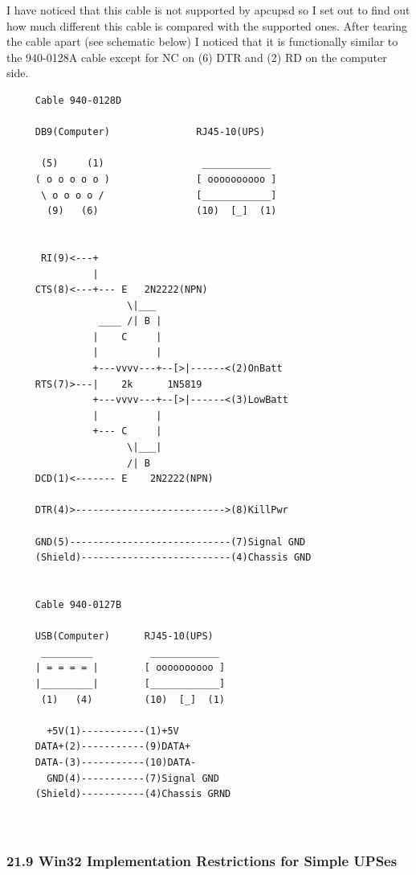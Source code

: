 {{{{{{{{{{I have noticed that this cable is not supported by apcupsd so I set out to
find out how much different this cable is compared with the supported ones.
After tearing the cable apart (see schematic below) I noticed that it is
functionally similar to the 940-0128A cable except for NC on (6) DTR and (2)
RD on the computer side. 

\footnotesize
\begin{verbatim}
     Cable 940-0128D
     
     DB9(Computer)               RJ45-10(UPS)
     
      (5)     (1)                 ____________
     ( o o o o o )               [ oooooooooo ]
      \ o o o o /                [____________]
       (9)   (6)                 (10)  [_]  (1)
     
     
      RI(9)<---+
               |
     CTS(8)<---+--- E   2N2222(NPN)
                     \|___
                ____ /| B |
               |    C     |
               |          |
               +---vvvv---+--[>|------<(2)OnBatt
     RTS(7)>---|    2k      1N5819
               +---vvvv---+--[>|------<(3)LowBatt
               |          |
               +--- C     |
                     \|___|
                     /| B
     DCD(1)<------- E    2N2222(NPN)
     
     DTR(4)>-------------------------->(8)KillPwr
     
     GND(5)----------------------------(7)Signal GND
     (Shield)--------------------------(4)Chassis GND
     
     
     Cable 940-0127B
     
     USB(Computer)      RJ45-10(UPS)
      _________          ____________
     | = = = = |        [ oooooooooo ]
     |_________|        [____________]
      (1)   (4)         (10)  [_]  (1)
     
       +5V(1)-----------(1)+5V
     DATA+(2)-----------(9)DATA+
     DATA-(3)-----------(10)DATA-
       GND(4)-----------(7)Signal GND
     (Shield)-----------(4)Chassis GRND
     
     
\end{verbatim}
\normalsize

\label{Win32-Implementation-Restrictions-for-Simple-UPSes}

\subsubsection*{21.9 Win32 Implementation Restrictions for Simple UPSes}

}}}}}}}}}}
